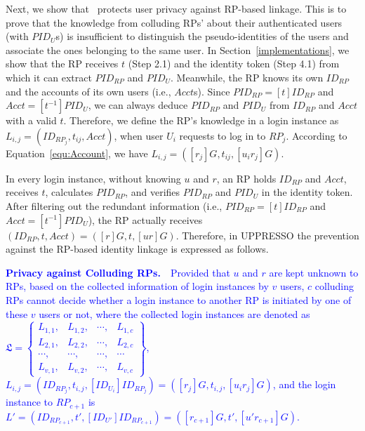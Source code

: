 {{%

Next, we show that \usso~protects user privacy against RP-based linkage. This is to prove that the knowledge from colluding RPs' about their authenticated users (with $PID_U$s) is insufficient to distinguish the pseudo-identities of the users and associate the ones belonging to the same user. In Section~\ref{implementations}, we show that the RP receives $t$ (Step 2.1) and the identity token (Step 4.1) from which it can extract $PID_{RP}$ and $PID_U$. Meanwhile, the RP knows its own $ID_{RP}$ and the accounts of its own users (i.e., $Acct$s). Since $PID_{RP}= [t]{ID_{RP}}$ and $Acct = [t^{-1}]PID_{U}$, we can always deduce $PID_{RP}$ and $PID_U$ from $ID_{RP}$ and $Acct$ with a valid $t$. Therefore, we define the RP's knowledge in a login instance as $L_{i, j}=(ID_{RP_j}, t_{ij}, Acct)$, when user $U_i$ requests to log in to $RP_j$. According to Equation~\ref{equ:Account}, we have $L_{i, j}=([r_j]G, t_{ij}, [u_ir_j]G)$.

\oldc

\vspace{1mm}
In every login instance, without knowing $u$ and $r$, an RP holds $ID_{RP}$ and $Acct$, receives $t$, calculates $PID_{RP}$, and verifies $PID_{RP}$ and $PID_U$ in the identity token. After filtering out the redundant information (i.e., $PID_{RP}= [t]{ID_{RP}}$ and $Acct = [t^{-1}]PID_{U}$), the RP actually receives $(ID_{RP}, t, Acct) = ([r]G, t, [ur]G)$. Therefore, in UPPRESSO the prevention against the RP-based identity linkage is expressed as follows.

\vspace{1mm}
\noindent\textcolor{blue}{\textbf{Privacy against Colluding RPs.}~~Provided that $u$ and $r$ are kept unknown to RPs,
based on the collected information of login instances by $v$ users,
$c$ colluding RPs cannot decide whether a login instance to another RP is initiated by one of these $v$ users or not,
    where
    the collected login instances are denoted as $\mathfrak{L}=\left\{ \begin{matrix}
L_{1,1}, & L_{1,2}, & \cdots, & L_{1,c}\\
L_{2,1}, & L_{2,2}, & \cdots, & L_{2,c}\\
\cdots, & \cdots, & \cdots, & \cdots\\
L_{v,1}, & L_{v,2}, & \cdots, & L_{v,c}
\end{matrix}\right\}$, $L_{i, j} = (ID_{RP_j}, t_{i, j}, [ID_{U_i}]{ID_{RP_j}}) = ([r_j]G, t_{i,j}, [u_ir_j]G)$,
    and the login instance to $RP_{c+1}$ is $L'=(ID_{RP_{c+1}}, t', [ID_{U'}]ID_{RP_{c+1}}) = ([r_{c+1}]G, t', [u'r_{c+1}]G)$.}


}}
